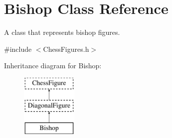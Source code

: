 \hypertarget{classBishop}{}\section{Bishop Class Reference}
\label{classBishop}


A class that represents bishop figures.  




{\ttfamily \#include $<$Chess\+Figures.\+h$>$}

Inheritance diagram for Bishop\+:\begin{figure}[H]
\begin{center}
\leavevmode
\includegraphics[height=3.000000cm]{classBishop}
\end{center}
\end{figure}
